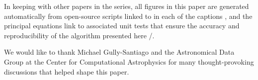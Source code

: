 \documentclass[modern]{aastex62}
\begin{document}
\vspace{2em}

In keeping with other papers in the \starry series, all figures in this
paper are generated automatically from open-source scripts linked to in
each of the captions \codeicon, and the principal equations link to associated
unit tests that ensure the accuracy and reproducibility of the algorithm
presented here \testpassicon/\testfailicon.

%
%
%
%
%
%
%
%

\vspace{2em}

We would like to thank Michael Gully-Santiago and the
Astronomical Data Group at the Center for Computational Astrophysics for
many thought-provoking discussions that helped shape this paper.


\end{document}
